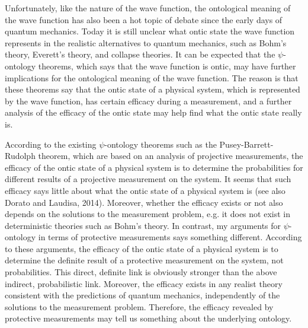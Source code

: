 Unfortunately, like the nature of the wave function, the ontological meaning of the wave function has also been a hot topic of debate since the early days of quantum mechanics. Today it is still unclear what ontic state the wave function represents in the realistic alternatives to quantum mechanics, such as Bohm's theory, Everett's theory, and collapse theories. 
It can be expected that the $\psi$-ontology theorems, which says that the wave function is ontic, may have further implications for the ontological meaning of the wave function.
The reason is that these theorems say that the ontic state of a physical system, which is represented by  the wave function, has certain efficacy during a measurement, and a further analysis of the efficacy of the ontic state may help find what the ontic state really is.

According to the existing $\psi$-ontology theorems such as the Pusey-Barrett-Rudolph theorem, which are based on an analysis of projective measurements, the efficacy of the ontic state of a physical system is to determine the probabilities for different results of a projective measurement on the system.
It seems that such efficacy says little about what the ontic state of a physical system is (see also Dorato and Laudisa, 2014). Moreover, whether  the efficacy exists or not also depends on the solutions to the measurement problem, e.g. it does not exist in deterministic theories such as Bohm's theory. 
In contrast, my arguments for $\psi$-ontology in terms of protective measurements says something different.
According to these arguments, the efficacy of the ontic state of a physical system is to determine the definite result of a protective measurement on the system, not probabilities. 
This direct, definite link is obviously stronger than the above indirect, probabilistic link.
Moreover, the efficacy exists in any realist theory consistent with the predictions of quantum mechanics, independently of the solutions to the measurement problem.
Therefore, the efficacy revealed by protective measurements may tell us something about the underlying ontology.

